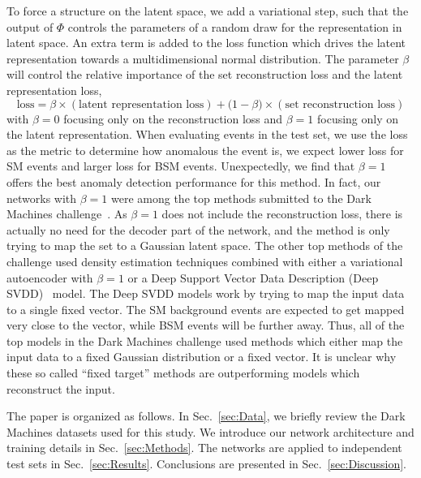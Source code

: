 \documentclass[submission, Phys]{SciPost}
\begin{document}
To force a structure on the latent space, we add a variational step, such that the output of $\Phi$ controls the parameters of a random draw for the representation in latent space.
An extra term is added to the loss function which drives the latent representation towards a multidimensional normal distribution.
The parameter $\beta$ will control the relative importance of the set reconstruction loss and the latent representation loss,
\begin{equation}
    \text{loss} = \beta \times (\text{latent representation loss}) + \big(1-\beta \big) \times (\text{set reconstruction loss})    
\end{equation}
with $\beta=0$ focusing only on the reconstruction loss and $\beta=1$ focusing only on the latent representation.
When evaluating events in the test set, we use the loss as the metric to determine how anomalous the event is, we expect lower loss for SM events and larger loss for BSM events.
Unexpectedly, we find that $\beta=1$ offers the best anomaly detection performance for this method.
In fact, our networks with $\beta=1$ were among the top methods submitted to the Dark Machines challenge~\cite{Aarrestad:2021oeb}.
As $\beta=1$ does not include the reconstruction loss, there is actually no need for the decoder part of the network, and the method is only trying to map the set to a Gaussian latent space.
The other top methods of the challenge used density estimation techniques combined with either a variational autoencoder with $\beta=1$ or a Deep Support Vector Data Description (Deep SVDD)~\cite{pmlr-v80-ruff18a} model.
The Deep SVDD models work by trying to map the input data to a single fixed vector.
The SM background events are expected to get mapped very close to the vector, while BSM events will be further away.
Thus, all of the top models in the Dark Machines challenge used methods which either map the input data to a fixed Gaussian distribution or a fixed vector.
It is unclear why these so called ``fixed target'' methods are outperforming models which reconstruct the input.

The paper is organized as follows.
In Sec.~\ref{sec:Data}, we briefly review the Dark Machines datasets used for this study.
We introduce our network architecture and training details in Sec.~\ref{sec:Methods}.
The networks are applied to independent test sets in Sec.~\ref{sec:Results}.
Conclusions are presented in Sec.~\ref{sec:Discussion}.

\end{document}
